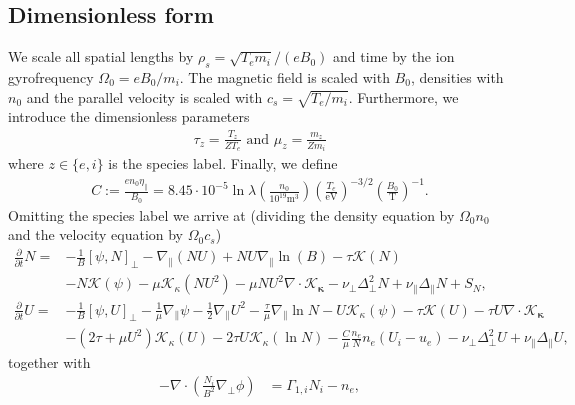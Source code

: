 \documentclass{hitec} %
\renewcommand{\vec}[1]{\boldsymbol{#1}}
\begin{document}
\subsection{Dimensionless form}
We scale all spatial lengths by $\rho_s = \sqrt{T_e m_i}/(eB_0)$ and time by the ion gyrofrequency $\Omega_0 = eB_0/m_i$.
The magnetic field is scaled with $B_0$, densities with $n_0$ and the parallel velocity is scaled with $c_s = \sqrt{T_e/m_i}$.
Furthermore, we introduce the dimensionless parameters
\begin{align}
  \tau_z = \frac{T_z}{ZT_e} \text{ and } \mu_z = \frac{m_z}{Zm_i}
  \label{}
\end{align}
where $z\in\{e,i\}$ is the species label. Finally, we define
\begin{align}
  C:=\frac{en_0\eta_\parallel}{B_0} = 8.45\cdot 10^{-5}\ln \lambda \left(\frac{n_0}{10^{19}\text{m}^3}\right) \left(\frac{T_e}{\text{eV}}\right)^{-3/2} \left(\frac{B_0}{\text{T}}\right)^{-1}.
    \label{}
\end{align}
Omitting the species label we arrive at (dividing the density equation by $\Omega_0n_0$ and the velocity equation by $\Omega_0 c_s$)
\begin{subequations}
    \begin{align}
    \frac{\partial}{\partial t} N =&
        - \frac{1}{B}[\psi, N]_{\perp}%
        - \nabla_\parallel \left( NU\right)
        + NU\nabla_\parallel\ln(B)
        - \tau \mathcal K(N) \nonumber \\&
        - N \mathcal K(\psi)
        -\mu \mathcal K_\kappa(NU^2)
        -\mu NU^2\nabla\cdot \vec{ \mathcal K_\kappa}
        - \nu_\perp\Delta_\perp^2 N + \nu_\parallel \Delta_\parallel N + S_N, \\
    \frac{\partial}{\partial t} U =&
        - \frac{1}{B}\left[\psi, U\right]_{\perp}%
        - \frac{1}{\mu} \nabla_\parallel \psi%
        - \frac{1}{2}\nabla_\parallel U^2
        -\frac{\tau}{\mu} \nabla_\parallel \ln N
        - U\mathcal K_\kappa(\psi)
        - \tau \mathcal K(U)
        -\tau U\nabla\cdot\vec{ \mathcal K_\kappa}\nonumber\\&
        - \left(2\tau + {\mu}U^2\right) \mathcal K_\kappa (U)
        -2\tau U\mathcal K_\kappa(\ln N)
        - \frac{C}{\mu} \frac{n_e}{N}n_e(U_i - u_e)
        - \nu_\perp\Delta_\perp^2 U + \nu_\parallel \Delta_\parallel U ,
        \label{eq:EgyrofluidU}
    \end{align}
    \label{eq:Egyrofluid}
\end{subequations}
together with
  \begin{align}
    -\nabla\cdot\left( \frac{N_i}{B^2}\nabla_\perp \phi \right) &= \Gamma_{1,i} N_i - n_e, \label{eq:Egfmaxwell}
  \end{align}
\end{document}
